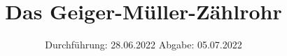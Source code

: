 

\subject{VERSUCH 703}
\title{Das Geiger-Müller-Zählrohr}
\date{%
  Durchführung: 28.06.2022
  \hspace{3em}
  Abgabe: 05.07.2022
}



\maketitle
\thispagestyle{empty}
\tableofcontents
\newpage







\printbibliography{}


